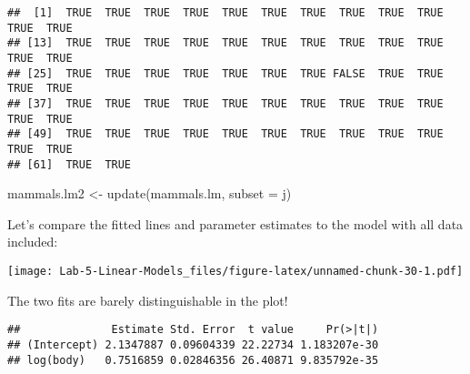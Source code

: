 \documentclass[
]{article}
\newenvironment{Shaded}{\begin{snugshade}}{\end{snugshade}}
\newcommand{\AttributeTok}[1]{\textcolor[rgb]{0.77,0.63,0.00}{#1}}
\newcommand{\CommentTok}[1]{\textcolor[rgb]{0.56,0.35,0.01}{\textit{#1}}}
\newcommand{\DecValTok}[1]{\textcolor[rgb]{0.00,0.00,0.81}{#1}}
\newcommand{\FunctionTok}[1]{\textcolor[rgb]{0.00,0.00,0.00}{#1}}
\newcommand{\NormalTok}[1]{#1}
\newcommand{\OtherTok}[1]{\textcolor[rgb]{0.56,0.35,0.01}{#1}}
\newcommand{\SpecialCharTok}[1]{\textcolor[rgb]{0.00,0.00,0.00}{#1}}
\begin{document}
\begin{verbatim}
##  [1]  TRUE  TRUE  TRUE  TRUE  TRUE  TRUE  TRUE  TRUE  TRUE  TRUE  TRUE  TRUE
## [13]  TRUE  TRUE  TRUE  TRUE  TRUE  TRUE  TRUE  TRUE  TRUE  TRUE  TRUE  TRUE
## [25]  TRUE  TRUE  TRUE  TRUE  TRUE  TRUE  TRUE FALSE  TRUE  TRUE  TRUE  TRUE
## [37]  TRUE  TRUE  TRUE  TRUE  TRUE  TRUE  TRUE  TRUE  TRUE  TRUE  TRUE  TRUE
## [49]  TRUE  TRUE  TRUE  TRUE  TRUE  TRUE  TRUE  TRUE  TRUE  TRUE  TRUE  TRUE
## [61]  TRUE  TRUE
\end{verbatim}

\begin{Shaded}
\begin{Highlighting}[]
\NormalTok{mammals.lm2 }\OtherTok{\textless{}{-}} \FunctionTok{update}\NormalTok{(mammals.lm, }\AttributeTok{subset =}\NormalTok{ j)}
\end{Highlighting}
\end{Shaded}

Let's compare the fitted lines and parameter estimates to the model with
all data included:

\begin{Shaded}
\end{Shaded}

\texttt{[image: Lab-5-Linear-Models\_files/figure-latex/unnamed-chunk-30-1.pdf]}

The two fits are barely distinguishable in the plot!

\begin{Shaded}
\end{Shaded}

\begin{verbatim}
##              Estimate Std. Error  t value     Pr(>|t|)
## (Intercept) 2.1347887 0.09604339 22.22734 1.183207e-30
## log(body)   0.7516859 0.02846356 26.40871 9.835792e-35
\end{verbatim}
\end{document}
